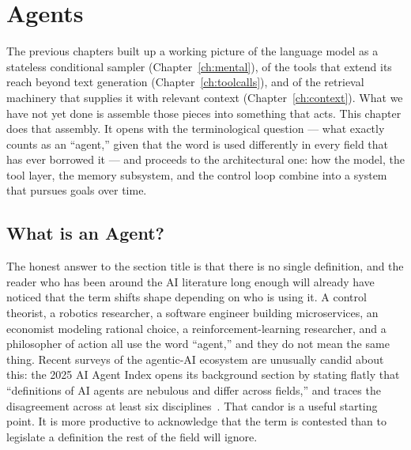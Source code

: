 %

\chapter{Agents}
\label{ch:agents}


The previous chapters built up a working picture of the language
model as a stateless conditional sampler
(Chapter~\ref{ch:mental}), of the tools that extend its reach
beyond text generation (Chapter~\ref{ch:toolcalls}), and of the
retrieval machinery that supplies it with relevant context
(Chapter~\ref{ch:context}). What we have not yet done is assemble
those pieces into something that acts. This chapter does that
assembly. It opens with the terminological question --- what
exactly counts as an ``agent,'' given that the word is used
differently in every field that has ever borrowed it --- and
proceeds to the architectural one: how the model, the tool layer,
the memory subsystem, and the control loop combine into a system
that pursues goals over time.

\section{What is an Agent?}
\label{sec:agents-what}

The honest answer to the section title is that there is no single
definition, and the reader who has been around the AI literature
long enough will already have noticed that the term shifts shape
depending on who is using it. A control theorist, a robotics
researcher, a software engineer building microservices, an
economist modeling rational choice, a reinforcement-learning
researcher, and a philosopher of action all use the word
``agent,'' and they do not mean the same thing. Recent surveys of
the agentic-AI ecosystem are unusually candid about this: the
2025 AI Agent Index opens its background section by stating
flatly that ``definitions of AI agents are nebulous and differ
across fields,'' and traces the disagreement across at least six
disciplines~\citep{staufer2026aiagentindex}. That candor is a
useful starting point. It is more productive to acknowledge that
the term is contested than to legislate a definition the rest of
the field will ignore.

